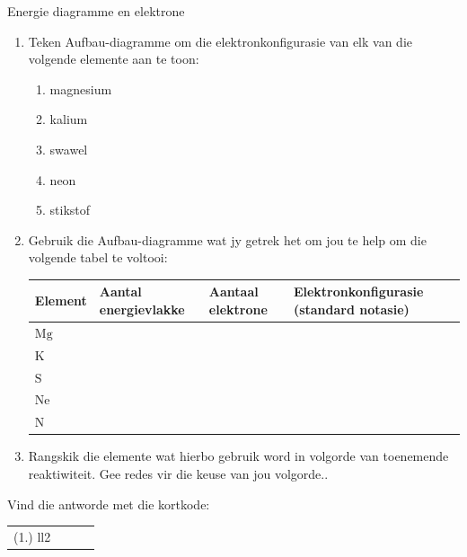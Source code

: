 \begin{exercises}{Energie diagramme en elektrone}
            \nopagebreak
        \label{m38741*id260063}\begin{enumerate}[noitemsep, label=\textbf{\arabic*}. ] 
            \label{m38741*uid106}\item Teken Aufbau-diagramme om die elektronkonfigurasie van elk van die volgende elemente aan te toon:
\label{m38741*id260079}\begin{enumerate}[noitemsep, label=\textbf{\alph*}. ] 
            \label{m38741*uid107}\item magnesium
\label{m38741*uid108}\item kalium
\label{m38741*uid109}\item swawel
\label{m38741*uid110}\item neon
\label{m38741*uid111}\item stikstof
\end{enumerate}
        \label{m38741*uid112}\item Gebruik die Aufbau-diagramme wat jy getrek het om jou te help om die volgende tabel te voltooi:
       \begin{center}
\begin{tabular}{|p{1.6cm}|p{2.6cm}|p{2.6cm}|p{2.6cm}|}\hline
\textbf{Element} & \textbf{Aantal energievlakke} & \textbf{Aantaal elektrone}  & \textbf{Elektronkonfigurasie (standard notasie)}\\\hline
$\text{Mg}$ & &  & \\\hline
$\text{K}$ & &  & \\\hline
$\text{S}$ & & & \\\hline
$\text{Ne}$ &  & & \\\hline
$\text{N}$ & & & \\\hline
\end{tabular}
\end{center}    

  \label{m38741*uid113}\item Rangskik die elemente wat hierbo gebruik word in volgorde van toenemende reaktiwiteit. Gee redes vir die keuse van jou volgorde..
 \end{enumerate}
 Vind die antworde met die kortkode:
 \par \begin{tabular}[h]{cccc}
 (1.) ll2 & & & \end{tabular}
\end{exercises}            
